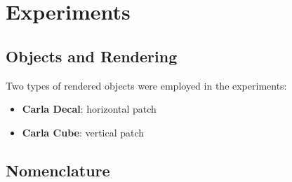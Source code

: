 \chapter{Experiments}
\label{experiments}

\section{Objects and Rendering}

Two types of rendered objects were employed in the experiments:
\begin{itemize}
    \item \textbf{Carla Decal}: horizontal patch
    \item \textbf{Carla Cube}: vertical patch
\end{itemize}






\section{Nomenclature}

